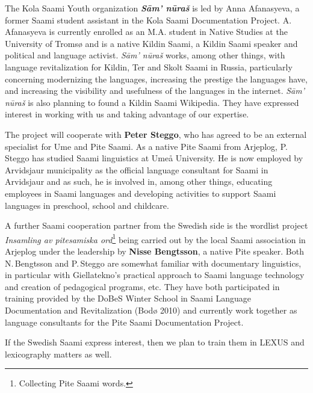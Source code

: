\documentclass[a4paper,12pt]{article}
\begin{document}
{{The Kola Saami Youth organization \textit{\textbf{Sām' nūraš}} is led by Anna Afanas\-yeva, a former Saami student assistant in the Kola Saami Documentation Project. A.\,Afanasyeva is currently enrolled as an M.A. student in Native Studies at the University of Tromsø and is a native Kildin Saami, a Kildin Saami speaker and political and language activist. {\it Sām' nūraš} works, among other things, with language revitalization for Kildin, Ter and Skolt Saami in Russia, particularly concerning modernizing the languages, increasing the prestige the languages have, and increasing the visibility and usefulness of the languages in the internet. {\it Sām' nūraš} is also planning to found a Kildin Saami Wikipedia. They have expressed interest in working with us and taking advantage of our expertise.

The project will cooperate with \textbf{Peter Steggo}, who has agreed to be an external specialist for Ume and Pite Saami. As a native Pite Saami from Arjeplog, P.\,Steggo has studied Saami linguistics at Umeå University. He is now employed by Arvidsjaur municipality as the official language consultant for Saami in Arvidsjaur and as such, he is involved in, among other things, educating employees in Saami languages and developing activities to support Saami languages in preschool, school and childcare.

A further Saami cooperation partner from the Swedish side is the wordlist project {\it Insamling av pitesamiska ord}\footnote{Collecting Pite Saami words.} being carried out by the local Saami association in Arjeplog under the leadership by {\bf Nisse Bengtsson}, a native Pite speaker. Both N.\,Bengtsson and P.\,Steggo are somewhat familiar with documentary linguistics, in particular with Giellatekno's practical approach to Saami language technology and creation of pedagogical programs, etc. They have both participated in training provided by the DoBeS Winter School in Saami Language Documentation and Revitalization (Bodø 2010) and currently work together as language consultants for the Pite Saami Documentation Project.

If the Swedish Saami express interest, then we plan to train them in LEXUS and lexicography matters as well.




}}
\end{document}
